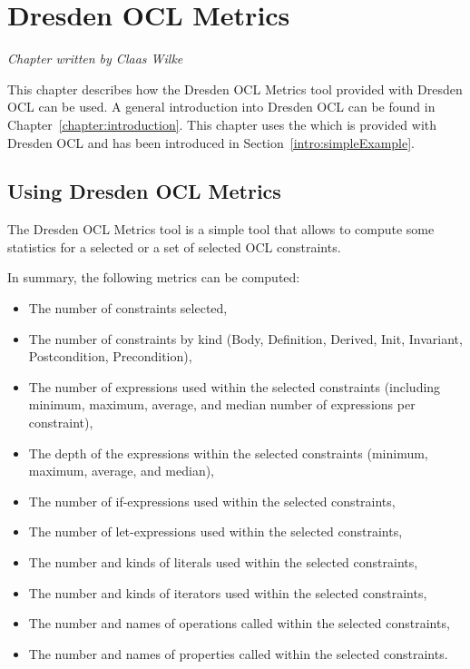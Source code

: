 \chapter{Dresden OCL Metrics}
\label{chapter:metrics}

\begin{flushright}
\textit{Chapter written by Claas Wilke}
\end{flushright}

This chapter describes how the Dresden OCL Metrics tool provided with Dresden
OCL can be used. A general introduction into Dresden OCL can be found in
Chapter~\ref{chapter:introduction}.
This chapter uses the  which is provided with 
Dresden OCL and has been introduced in Section~\ref{intro:simpleExample}. 



\section{Using Dresden OCL Metrics}

The Dresden OCL Metrics tool is a simple tool that allows to compute some
statistics for a selected or a set of selected OCL constraints.

In summary, the following metrics can be computed:

\begin{itemize}
  \item The number of constraints selected,
  \item The number of constraints by kind (Body, Definition, Derived,
  Init, Invariant, Postcondition, Precondition),
  \item The number of expressions used within the selected constraints
  (including minimum, maximum, average, and median number of expressions per
  constraint),
  \item The depth of the expressions within the selected constraints (minimum,
  maximum, average, and median),
  \item The number of if-expressions used within the selected constraints,
  \item The number of let-expressions used within the selected constraints,
  \item The number and kinds of literals used within the selected constraints,
  \item The number and kinds of iterators used within the selected constraints,
  \item The number and names of operations called within the selected
  constraints,
  \item The number and names of properties called within the selected
  constraints.
\end{itemize}

